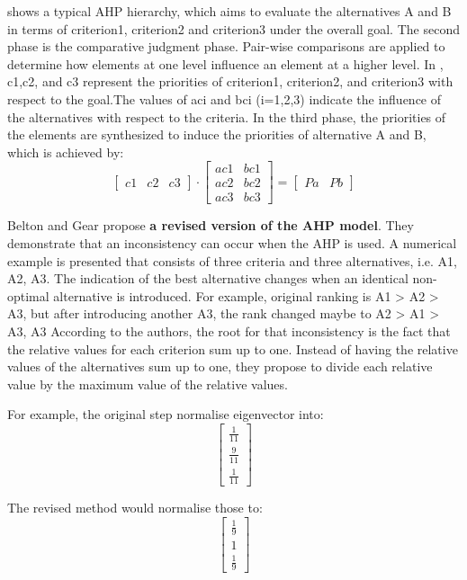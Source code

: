  shows a typical AHP hierarchy, which aims to evaluate the alternatives A and B in terms of criterion1, criterion2 and criterion3 under the overall goal.
The second phase is the comparative judgment phase.
Pair-wise comparisons are applied to determine how elements at one level influence an element at a higher level.
In , c1,c2, and c3 represent the priorities of criterion1, criterion2, and criterion3 with respect to the goal.The values of aci and bci (i=1,2,3) indicate the influence of the alternatives with respect to the criteria. In the third phase, the priorities of the elements are synthesized to induce the priorities of alternative A and B, which is achieved by:
$$
\begin{bmatrix}
c1 & c2 & c3
\end{bmatrix}
\cdot
\begin{bmatrix}
ac1 & bc1 \\
ac2 & bc2 \\
ac3 & bc3
\end{bmatrix}
=
\begin{bmatrix}
Pa & Pb
\end{bmatrix}
$$

Belton and Gear \cite{revisedAHP} propose \textbf{a revised version of the AHP model}. They demonstrate that an inconsistency can occur when the AHP is used. A numerical example is presented that consists of three criteria and three alternatives, i.e. A1, A2, A3.
The indication of the best alternative changes when an identical non-optimal alternative is introduced. For example, original ranking is A1 > A2 > A3, but after introducing another A3, the rank changed maybe to A2 > A1 > A3, A3
According to the authors, the root for that inconsistency is the fact that the relative values for each criterion sum up to one. Instead of having the relative values of the alternatives sum up to one, they propose to divide each relative value by the maximum value of the relative values.

For example, the original step normalise eigenvector into:
$$\begin{bmatrix}
\frac{1}{11} \\
\frac{9}{11} \\
\frac{1}{11}
\end{bmatrix}$$

The revised method would normalise those to:
$$\begin{bmatrix}
\frac{1}{9} \\
1 \\
\frac{1}{9}
\end{bmatrix}$$

